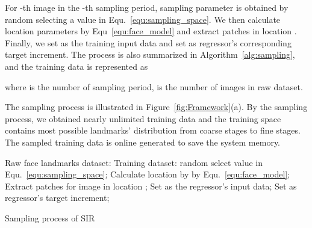 \documentclass[letterpaper]{article} \usepackage{aaai18}  \usepackage{times}  \usepackage{helvet}  \usepackage{courier}  \usepackage{url}  \usepackage{graphicx}
\begin{document}
For -th image in the -th sampling period, sampling parameter  is obtained by random selecting a value in Equ.~\eqref{equ:sampling_space}. We then calculate location parameters  by Equ~\eqref{equ:face_model} and extract patches  in location . Finally, we set  as the training input data and set  as regressor's corresponding target increment. The process is also summarized in Algorithm~\ref{alg:sampling}, and the training data is represented as

where  is the number of sampling period,  is the number of images in raw dataset.

The sampling process is illustrated in Figure~\ref{fig:Framework}(a). By the sampling process, we obtained nearly unlimited training data and the training space contains most possible landmarks' distribution from coarse stages to fine stages. The sampled training data is online generated to save the system memory.
\begin{algorithm}[ht]
\begin{algorithmic}[1]
\REQUIRE Raw face landmarks dataset: 
\ENSURE Training dataset: 
        \STATE random select value  in Equ.~\eqref{equ:sampling_space};
        \STATE Calculate location  by  by Equ.~\eqref{equ:face_model};
        \STATE Extract patches  for image  in location ;
        \STATE Set  as the regressor's input data;
        \STATE Set  as regressor's target increment;
    \ENDFOR
\ENDFOR
\end{algorithmic}
\caption{Sampling process of SIR}
\label{alg:sampling}
\end{algorithm}
\end{document}
